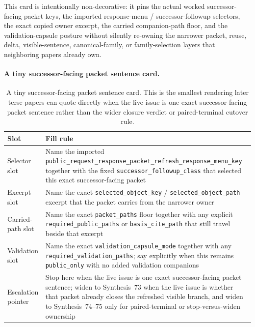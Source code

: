 \documentclass[11pt]{article}
\begin{document}
This card is intentionally non-decorative: it pins the actual worked successor-facing packet keys, the imported response-menu / successor-followup selectors, the exact copied owner excerpt, the carried companion-path floor, and the validation-capsule posture without silently re-owning the narrower packet, reuse, delta, visible-sentence, canonical-family, or family-selection layers that neighboring papers already own.\cite{series:workedexample}

\paragraph{A tiny successor-facing packet sentence card.}
\begin{table}[t]
\centering
\small
\begin{tabularx}{\linewidth}{@{}LY@{}}
\toprule
Slot & Fill rule \\
\midrule
Selector slot & Name the imported \nolinkurl{public_request_response_packet_refresh_response_menu_key} together with the fixed \nolinkurl{successor_followup_class} that selected this exact successor-facing packet \\
Excerpt slot & Name the exact \nolinkurl{selected_object_key} / \nolinkurl{selected_object_path} excerpt that the packet carries from the narrower owner \\
Carried-path slot & Name the exact \nolinkurl{packet_paths} floor together with any explicit \nolinkurl{required_public_paths} or \nolinkurl{basis_cite_path} that still travel beside that excerpt \\
Validation slot & Name the exact \nolinkurl{validation_capsule_mode} together with any \nolinkurl{required_validation_paths}; say explicitly when this remains \nolinkurl{public_only} with no added validation companions \\
Escalation pointer & Stop here when the live issue is one exact successor-facing packet sentence; widen to Synthesis~73 when the live issue is whether that packet already closes the refreshed visible branch, and widen to Synthesis~74--75 only for paired-terminal or stop-versus-widen ownership \\
\bottomrule
\end{tabularx}
\caption{A tiny successor-facing packet sentence card. This is the smallest rendering later terse papers can quote directly when the live issue is one exact successor-facing packet sentence rather than the wider closure verdict or paired-terminal cutover rule.}
\label{tab:successor-facing-packet-sentence-card}
\end{table}
\end{document}
